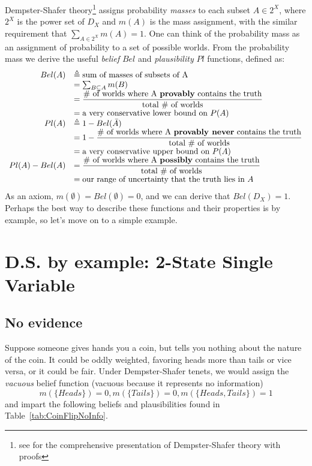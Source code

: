 \documentclass[letterpaper]{article}
\begin{document}
Dempster-Shafer theory\footnote{see \cite{Shafer1976} for the comprehensive presentation of Dempster-Shafer theory with proofs} assigns probability \textit{masses} to each subset $A \in 2^X$, where $2^X$ is the power set of $D_X$ and $m(A)$ is the mass assignment, with the similar requirement that $\sum_{A \in 2^{X}}m(A) = 1$.  One can think of the probability mass as an assignment of probability to a set of possible worlds.  
From the probability mass we derive the useful \textit{belief} $Bel$ and \textit{plausibility} $Pl$ functions, defined as:
\[
\begin{array}{rl}
Bel(A) & \triangleq \text{sum of masses of subsets of A}\\
	& = \sum_{B \subseteq A} m(B) \\
	& = \dfrac{\text{\# of worlds where A \textbf{provably} contains the truth}}{\text{total \# of worlds}}\\
	& = \text{a very conservative lower bound on } P(A)\\
Pl(A) & \triangleq 1-Bel(\bar{A})\\
	& = 1-\dfrac{\text{\# of worlds where A \textbf{provably never} contains the truth}}{\text{total \# of worlds}}\\
	& = \text{a very conservative upper bound on } P(A)\\
Pl(A)-Bel(A) & = \dfrac{\text{\# of worlds where A \textbf{possibly} contains the truth}}{\text{total \# of worlds}}\\
	& = \text{our range of uncertainty that the truth lies in } A
\end{array}
\]
As an axiom, $m(\emptyset)=Bel(\emptyset)=0$, and we can derive that $Bel(D_X)=1$.  Perhaps the best way to describe these functions and their properties is by example, so let's move on to a simple example.

\section{D.S. by example: 2-State Single Variable}
\subsection{No evidence}
Suppose someone gives hands you a coin, but tells you nothing about the nature of the coin.  It could be oddly weighted, favoring heads more than tails or vice versa, or it could be fair.  Under Dempster-Shafer tenets, we would assign the \textit{vacuous} belief function (vacuous because it represents no information)
\[ m(\{Heads\}) = 0, m(\{Tails\}) = 0, m(\{Heads,Tails\})=1 \]
and impart the following beliefs and plausibilities found in Table~\ref{tab:CoinFlipNoInfo}.
\end{document}

